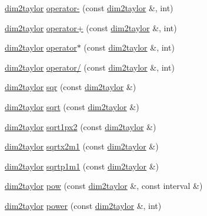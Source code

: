 \begin{DoxyCompactItemize}
\item 
\hyperlink{classtaylor_1_1dim2taylor}{dim2taylor} \hyperlink{classtaylor_1_1dim2taylor_a40a2fbde540b34e912071fa7ec7ebc40}{operator-\/} (const \hyperlink{classtaylor_1_1dim2taylor}{dim2taylor} \&, int)
\item 
\hyperlink{classtaylor_1_1dim2taylor}{dim2taylor} \hyperlink{classtaylor_1_1dim2taylor_a98134295941b50ca9a1bb27653d8c66d}{operator+} (const \hyperlink{classtaylor_1_1dim2taylor}{dim2taylor} \&, int)
\item 
\hyperlink{classtaylor_1_1dim2taylor}{dim2taylor} \hyperlink{classtaylor_1_1dim2taylor_ac6fe62a3f83125b97038c34d8bb70e0f}{operator$\ast$} (const \hyperlink{classtaylor_1_1dim2taylor}{dim2taylor} \&, int)
\item 
\hyperlink{classtaylor_1_1dim2taylor}{dim2taylor} \hyperlink{classtaylor_1_1dim2taylor_ac66f42b7e2992aaa02b88898cd1da51f}{operator/} (const \hyperlink{classtaylor_1_1dim2taylor}{dim2taylor} \&, int)
\item 
\hyperlink{classtaylor_1_1dim2taylor}{dim2taylor} \hyperlink{classtaylor_1_1dim2taylor_a0918e81021192eed36a5b0fb102247ea}{sqr} (const \hyperlink{classtaylor_1_1dim2taylor}{dim2taylor} \&)
\item 
\hyperlink{classtaylor_1_1dim2taylor}{dim2taylor} \hyperlink{classtaylor_1_1dim2taylor_a2d7a004d2ee48a630edfc41746512d93}{sqrt} (const \hyperlink{classtaylor_1_1dim2taylor}{dim2taylor} \&)
\item 
\hyperlink{classtaylor_1_1dim2taylor}{dim2taylor} \hyperlink{classtaylor_1_1dim2taylor_a0ee48b960b16cd8d2ecbafeb58420022}{sqrt1px2} (const \hyperlink{classtaylor_1_1dim2taylor}{dim2taylor} \&)
\item 
\hyperlink{classtaylor_1_1dim2taylor}{dim2taylor} \hyperlink{classtaylor_1_1dim2taylor_a91a86e0655561bafd6c1609ab75ce13e}{sqrtx2m1} (const \hyperlink{classtaylor_1_1dim2taylor}{dim2taylor} \&)
\item 
\hyperlink{classtaylor_1_1dim2taylor}{dim2taylor} \hyperlink{classtaylor_1_1dim2taylor_a43d67bd8644d997c3acb7ec15302d543}{sqrtp1m1} (const \hyperlink{classtaylor_1_1dim2taylor}{dim2taylor} \&)
\item 
\hyperlink{classtaylor_1_1dim2taylor}{dim2taylor} \hyperlink{classtaylor_1_1dim2taylor_abdf82637f3423a00d9f6537e0e24b1ec}{pow} (const \hyperlink{classtaylor_1_1dim2taylor}{dim2taylor} \&, const interval \&)
\item 
\hyperlink{classtaylor_1_1dim2taylor}{dim2taylor} \hyperlink{classtaylor_1_1dim2taylor_a56014cfe86271f3c7381f38719840488}{power} (const \hyperlink{classtaylor_1_1dim2taylor}{dim2taylor} \&, int)

\end{DoxyCompactItemize}
